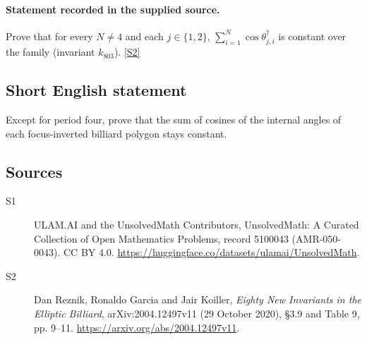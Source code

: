 \documentclass[11pt]{article}
\newcommand{\sref}[2]{\hyperlink{source:#1:#2}{[S#2]}}
\begin{document}
\paragraph{Statement recorded in the supplied source.}
Prove that for every $N\ne4$ and each $j\in\{1,2\}$, $\sum_{i=1}^N\cos\theta_{j,i}^\dagger$ is constant over the family (invariant $k_{803}$). \sref{5100043}{2}
\subsection{Short English statement}
Except for period four, prove that the sum of cosines of the internal angles of each focus-inverted billiard polygon stays constant.
\subsection{Sources}
\begin{description}
\item[\hypertarget{source:5100043:1}{S1}] ULAM.AI and the UnsolvedMath Contributors, UnsolvedMath: A Curated Collection of Open Mathematics Problems, record 5100043 (AMR-050-0043). CC BY 4.0. \url{https://huggingface.co/datasets/ulamai/UnsolvedMath}.
\item[\hypertarget{source:5100043:2}{S2}] Dan Reznik, Ronaldo Garcia and Jair Koiller, \emph{Eighty New Invariants in the Elliptic Billiard}, arXiv:2004.12497v11 (29 October 2020), \S3.9 and Table 9, pp. 9--11. \url{https://arxiv.org/abs/2004.12497v11}.
\end{description}
\label{end:5100043}
\end{document}
